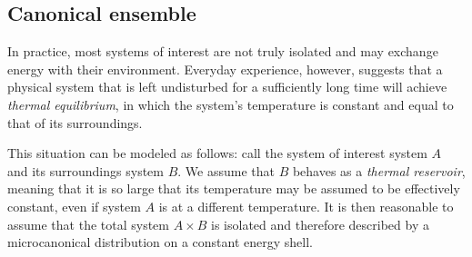 
\subsection{Canonical ensemble}

In practice, most systems of interest are not truly isolated and may exchange
energy with
their environment. Everyday experience, however, suggests that
a physical system that is left undisturbed for a sufficiently long time will achieve
\emph{thermal equilibrium}, in which the system's
temperature is constant and equal to that of its surroundings.

This situation can be modeled as follows: call the system of interest system $A$ and
its surroundings system $B$. We assume that $B$ behaves as a \emph{thermal reservoir},
meaning that it is so large that its temperature may be assumed to be effectively
constant, even if system $A$ is at a different temperature.
It is then reasonable to assume that the total system $A \times B$
is isolated and therefore described by a microcanonical distribution on a constant energy shell.

